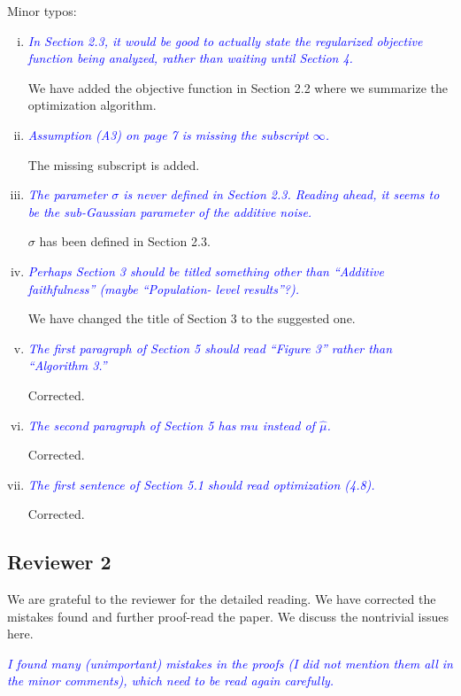 \documentclass[pdftex,12pt]{article}
\let\hat\widehat
\def\rc#1{{\it\textcolor{blue}{#1}}\smallskip}
\begin{document}
\begin{enumerate}[(1)]
Minor typos:
\begin{enumerate}[(i)]
\item \rc{In Section 2.3, it would be good to actually state the regularized
objective function being analyzed, rather than waiting until Section
4.}

We have added the objective function in Section 2.2 where we summarize the optimization algorithm.

\item \rc{Assumption (A3) on page 7 is missing the subscript $\infty$.}

The missing subscript is added.

\item \rc{The parameter $\sigma$ is never defined in Section 2.3. Reading ahead,
it seems to be the sub-Gaussian parameter of the additive noise.}

$\sigma$ has been defined in Section 2.3.

\item \rc{Perhaps Section 3 should be titled something other than ``Additive
faithfulness'' (maybe ``Population- level results''?).}

We have changed the title of Section 3 to the suggested one.

\item \rc{The first paragraph of Section 5 should read
  ``Figure 3'' rather than ``Algorithm 3.''}

Corrected.

\item \rc{The second paragraph of Section 5 has $m\hat{}u$ instead of $\hat\mu$.}

Corrected.

\item \rc{The first sentence of Section 5.1 should read optimization (4.8).}

Corrected.

\end{enumerate}

\end{enumerate}

\subsection*{Reviewer 2}


We are grateful to the reviewer for the detailed reading. We have corrected the mistakes found and further proof-read the paper. We discuss the nontrivial issues here.  

\rc{I found many (unimportant) mistakes in the proofs (I
  did not mention them all in the minor comments), which need to be
  read again carefully.}
\end{document}
